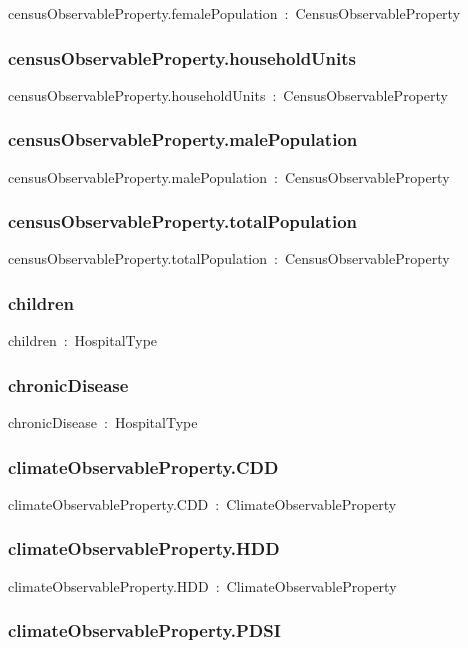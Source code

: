 \documentclass{article}
\begin{document}
censusObservableProperty.femalePopulation~:~CensusObservableProperty

\subsubsection*{censusObservableProperty.householdUnits}

censusObservableProperty.householdUnits~:~CensusObservableProperty

\subsubsection*{censusObservableProperty.malePopulation}

censusObservableProperty.malePopulation~:~CensusObservableProperty

\subsubsection*{censusObservableProperty.totalPopulation}

censusObservableProperty.totalPopulation~:~CensusObservableProperty

\subsubsection*{children}

children~:~HospitalType

\subsubsection*{chronicDisease}

chronicDisease~:~HospitalType

\subsubsection*{climateObservableProperty.CDD}

climateObservableProperty.CDD~:~ClimateObservableProperty

\subsubsection*{climateObservableProperty.HDD}

climateObservableProperty.HDD~:~ClimateObservableProperty

\subsubsection*{climateObservableProperty.PDSI}
\end{document}
